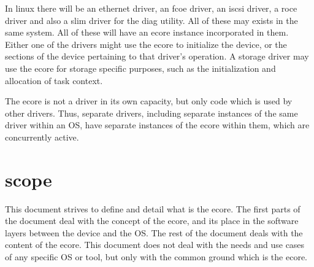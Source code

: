 \documentclass[11pt,fleqn,hidelinks,oneside]{book} %
\begin{document}
\begin{exampleT}
	In linux there will be an ethernet driver, an fcoe driver, an iscsi driver, a roce driver and also a slim driver for the diag utility.
	All of these may exists in the same system.
	All of these will have an ecore instance incorporated in them.
	Either one of the drivers might use the ecore to initialize the device, or the sections of the device pertaining to that driver’s operation.
	A storage driver may use the ecore for storage specific purposes, such as the initialization and allocation of task context.
\end{exampleT}

The ecore is not a driver in its own capacity, but only code which is used by other drivers. Thus, separate drivers, including separate instances of the same driver within an OS, have separate instances of the ecore within them, which are concurrently active.

\section{scope}
This document strives to define and detail what is the ecore.
The first parts of the document deal with the concept of the ecore, and its place in the software layers between the device and the OS.
The rest of the document deals with the content of the ecore.
This document does not deal with the needs and use cases of any specific OS or tool, but only with the common ground which is the ecore.
\end{document}
